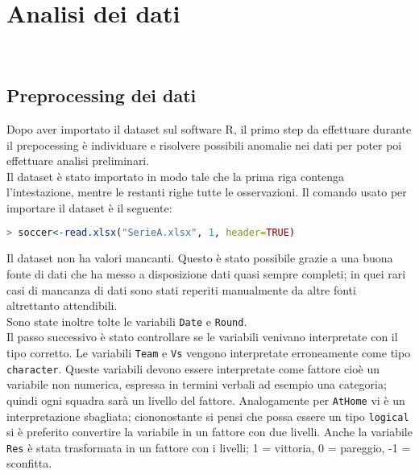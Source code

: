
\chapter{Analisi dei dati}
\\


\section{Preprocessing dei dati}
Dopo aver importato il dataset sul software R, il primo step da effettuare durante il prepocessing è individuare e risolvere possibili anomalie nei dati per poter poi effettuare analisi preliminari.\\
Il dataset è stato importato in modo tale che la prima riga contenga l'intestazione, mentre le restanti righe tutte le osservazioni. Il comando usato per importare il dataset è il seguente:\\

\begin{lstlisting}[language=R]
> soccer<-read.xlsx("SerieA.xlsx", 1, header=TRUE)
\end{lstlisting}
\bigskip
Il dataset non ha valori mancanti. Questo è stato possibile grazie a una buona fonte di dati che ha messo a disposizione dati quasi sempre completi; in quei rari casi di mancanza di dati sono stati reperiti manualmente da altre fonti altrettanto attendibili.\\
Sono state inoltre tolte le variabili \texttt{Date} e \texttt{Round}.\\
Il passo successivo è stato controllare se le variabili venivano interpretate con il tipo corretto. Le variabili \texttt{Team} e \texttt{Vs} vengono interpretate erroneamente come tipo \texttt{character}. Queste variabili devono essere interpretate come fattore cioè un variabile non numerica, espressa in termini verbali ad esempio una categoria; quindi ogni squadra sarà un livello del fattore. Analogamente per \texttt{AtHome} vi è un interpretazione sbagliata; ciononostante si pensi che possa essere un tipo \texttt{logical} si è preferito convertire la variabile in un fattore con due livelli. Anche la variabile \texttt{Res} è stata trasformata in un fattore con i livelli; 1 = vittoria, 0 = pareggio, -1 = sconfitta.


